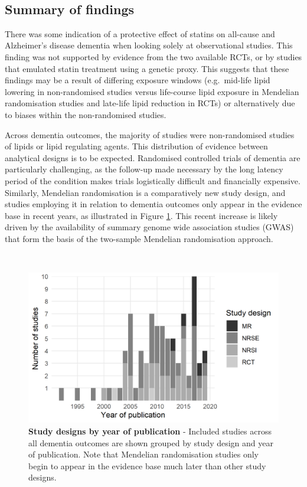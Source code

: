 \documentclass[a4paper, twoside]{templates/ociamthesis}
\begin{document}
~

\hypertarget{summary-of-findings}{%
\subsection{Summary of findings}\label{summary-of-findings}}

There was some indication of a protective effect of statins on all-cause and Alzheimer's disease dementia when looking solely at observational studies. This finding was not supported by evidence from the two available RCTs, or by studies that emulated statin treatment using a genetic proxy. This suggests that these findings may be a result of differing exposure windows (e.g.~mid-life lipid lowering in non-randomised studies versus life-course lipid exposure in Mendelian randomisation studies and late-life lipid reduction in RCTs) or alternatively due to biases within the non-randomised studies.

Across dementia outcomes, the majority of studies were non-randomised studies of lipids or lipid regulating agents. This distribution of evidence between analytical designs is to be expected. Randomised controlled trials of dementia are particularly challenging, as the follow-up made necessary by the long latency period of the condition makes trials logistically difficult and financially expensive. Similarly, Mendelian randomisation is a comparatively new study design, and studies employing it in relation to dementia outcomes only appear in the evidence base in recent years, as illustrated in Figure \ref{fig:typeByYear}. This recent increase is likely driven by the availability of summary genome wide association studies (GWAS) that form the basis of the two-sample Mendelian randomisation approach.

~





\begin{figure}[H]
\includegraphics[width=1\linewidth]{figures/sys-rev/type_by_year} \caption[Study designs by year of publication]{\textbf{Study designs by year of publication} - Included studies across all dementia outcomes are shown grouped by study design and year of publication. Note that Mendelian randomisation studies only begin to appear in the evidence base much later than other study designs.}\label{fig:typeByYear}
\end{figure}
\end{document}
